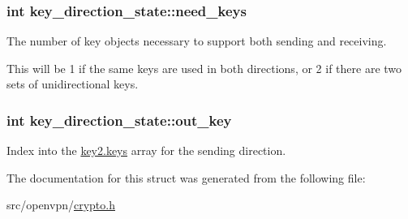 \subsubsection[{need\+\_\+keys}]{\setlength{\rightskip}{0pt plus 5cm}int key\+\_\+direction\+\_\+state\+::need\+\_\+keys}\label{structkey__direction__state_a235ef043e0135e9626b532d28c6a5ddc}
The number of key objects necessary to support both sending and receiving.

This will be 1 if the same keys are used in both directions, or 2 if there are two sets of unidirectional keys. \hypertarget{structkey__direction__state_acedd040b7d56fae540d55e6a380b42bb}{}
\subsubsection[{out\+\_\+key}]{\setlength{\rightskip}{0pt plus 5cm}int key\+\_\+direction\+\_\+state\+::out\+\_\+key}\label{structkey__direction__state_acedd040b7d56fae540d55e6a380b42bb}
Index into the {\ttfamily \hyperlink{structkey2_a9698a633f0112a2000a0efdb8d960010}{key2.\+keys}} array for the sending direction. 

The documentation for this struct was generated from the following file\+:\begin{DoxyCompactItemize}
\item 
src/openvpn/\hyperlink{crypto_8h}{crypto.\+h}\end{DoxyCompactItemize}
